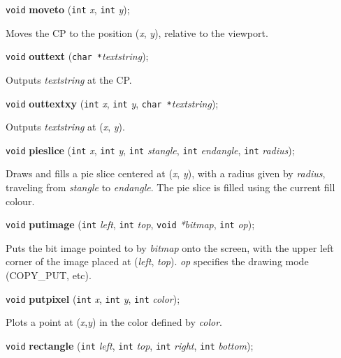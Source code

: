 \documentclass[a4paper,11pt]{article}
\newcommand{\V}{\texttt{void}}      %
\newcommand{\I}{\texttt{int}}       %
\newcommand{\C}{\texttt{char *}}    %
\newcommand{\func}[1]{\textbf{#1}}  %
\newcommand{\A}[1]{\emph{#1}}       %
\newenvironment{bgi}
{ %
  \begin{snugshade}
}
{ %
  \end{snugshade}
}
\begin{document}

\begin{bgi}
\V{} \func{moveto} (\I{} \A{x}, \I{} \A{y});
\end{bgi}

Moves the CP to the position (\A{x}, \A{y}), relative to the
viewport.


\begin{bgi}
\V{} \func{outtext} (\C{}\A{textstring});
\end{bgi}

Outputs \A{textstring} at the CP.


\begin{bgi}
\V{} \func{outtextxy} (\I{} \A{x}, \I{} \A{y}, \C{}\A{textstring});
\end{bgi}

Outputs \A{textstring} at (\A{x}, \A{y}).


\begin{bgi}
\V{} \func{pieslice} (\I{} \A{x}, \I{} \A{y}, \I{} \A{stangle}, \I{}
\A{endangle}, \I{} \A{radius});
\end{bgi}

Draws and fills a pie slice centered at (\A{x}, \A{y}), with a radius
given by \A{radius}, traveling from \A{stangle} to \A{endangle}. The
pie slice is filled using the current fill colour.


\begin{bgi}
\V{} \func{putimage} (\I{} \A{left}, \I{} \A{top}, \V{} \A{*bitmap},
\I{} \A{op});
\end{bgi}

Puts the bit image pointed to by \A{bitmap} onto the screen, with the
upper left corner of the image placed at (\A{left}, \A{top}). \A{op}
specifies the drawing mode (COPY\_PUT, etc).


\begin{bgi}
\V{} \func{putpixel} (\I{} \A{x}, \I{} \A{y}, \I{} \A{color}); 
\end{bgi}

Plots a point at (\A{x},\A{y}) in the color defined by \A{color}.


\begin{bgi}
\V{} \func{rectangle} (\I{} \A{left}, \I{} \A{top}, \I{} \A{right},
\I{} \A{bottom});
\end{bgi}
\end{document}
